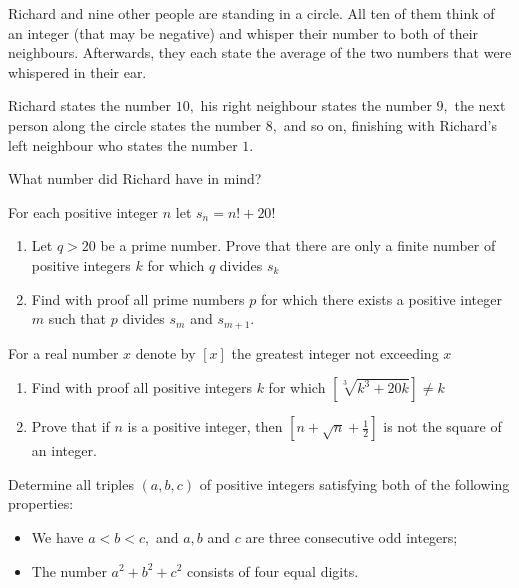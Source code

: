 \documentclass{pset}
\begin{document}
\begin{problems}
    \begin{problem}
    Richard and nine other people are standing in a circle. All ten of them think of an integer (that may be negative) and whisper their number to both of their neighbours. Afterwards, they each state the average of the two numbers that were whispered in their ear.

    Richard states the number \(10,\) his right neighbour states the number \(9,\) the next person along the circle states the number \(8,\) and so on, finishing with Richard's left neighbour who states the number \(1 .\)

    What number did Richard have in mind?
    \end{problem}

    \begin{problem}
    For each positive integer \(n\) let \(s_{n}=n !+20 !\)
    \begin{enumerate}
        \item Let \(q>20\) be a prime number. Prove that there are only a finite number of positive integers \(k\) for which \(q\) divides \(s_{k}\)
        \item Find with proof all prime numbers \(p\) for which there exists a positive integer \(m\) such that \(p\) divides \(s_{m}\) and \(s_{m + 1}\).
    \end{enumerate}
    \end{problem}

    \begin{problem}
    For a real number \(x\) denote by \([x]\) the greatest integer not exceeding \(x\)
    \begin{enumerate}
        \item Find with proof all positive integers \(k\) for which \([\sqrt[3]{k^{3}+20 k}] \neq k\)
        \item Prove that if \(n\) is a positive integer, then \(\left[n+\sqrt{n}+\frac{1}{2}\right]\) is not the square of an integer.
    \end{enumerate}
    \end{problem}

    \begin{problem}
    Determine all triples \((a, b, c)\) of positive integers satisfying both of the following properties:
    \begin{itemize}
        \item We have \(a<b<c,\) and \(a, b\) and \(c\) are three consecutive odd integers;
        \item The number \(a^{2}+b^{2}+c^{2}\) consists of four equal digits.
    \end{itemize}
    \end{problem}


\end{problems}
\end{document}
